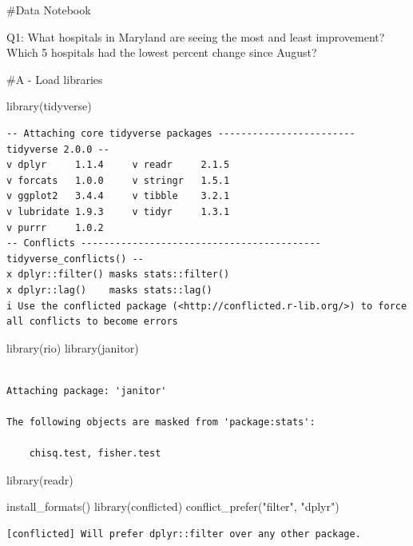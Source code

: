 \documentclass[
  letterpaper,
  DIV=11,
  numbers=noendperiod]{scrartcl}
\newenvironment{Shaded}{\begin{snugshade}}{\end{snugshade}}
\newcommand{\CommentTok}[1]{\textcolor[rgb]{0.37,0.37,0.37}{#1}}
\newcommand{\FunctionTok}[1]{\textcolor[rgb]{0.28,0.35,0.67}{#1}}
\newcommand{\NormalTok}[1]{\textcolor[rgb]{0.00,0.23,0.31}{#1}}
\newcommand{\StringTok}[1]{\textcolor[rgb]{0.13,0.47,0.30}{#1}}
\begin{document}
\#Data Notebook

Q1: What hospitals in Maryland are seeing the most and least
improvement? Which 5 hospitals had the lowest percent change since
August?

\begin{Shaded}
\begin{Highlighting}[]
\CommentTok{\#A {-} Load libraries}

\FunctionTok{library}\NormalTok{(tidyverse)}
\end{Highlighting}
\end{Shaded}

\begin{verbatim}
-- Attaching core tidyverse packages ------------------------ tidyverse 2.0.0 --
v dplyr     1.1.4     v readr     2.1.5
v forcats   1.0.0     v stringr   1.5.1
v ggplot2   3.4.4     v tibble    3.2.1
v lubridate 1.9.3     v tidyr     1.3.1
v purrr     1.0.2     
-- Conflicts ------------------------------------------ tidyverse_conflicts() --
x dplyr::filter() masks stats::filter()
x dplyr::lag()    masks stats::lag()
i Use the conflicted package (<http://conflicted.r-lib.org/>) to force all conflicts to become errors
\end{verbatim}

\begin{Shaded}
\begin{Highlighting}[]
\FunctionTok{library}\NormalTok{(rio)}
\FunctionTok{library}\NormalTok{(janitor)}
\end{Highlighting}
\end{Shaded}

\begin{verbatim}

Attaching package: 'janitor'

The following objects are masked from 'package:stats':

    chisq.test, fisher.test
\end{verbatim}

\begin{Shaded}
\begin{Highlighting}[]
\FunctionTok{library}\NormalTok{(readr)}

\FunctionTok{install\_formats}\NormalTok{()}
\FunctionTok{library}\NormalTok{(conflicted)}
\FunctionTok{conflict\_prefer}\NormalTok{(}\StringTok{"filter"}\NormalTok{, }\StringTok{"dplyr"}\NormalTok{)}
\end{Highlighting}
\end{Shaded}

\begin{verbatim}
[conflicted] Will prefer dplyr::filter over any other package.
\end{verbatim}
\end{document}
